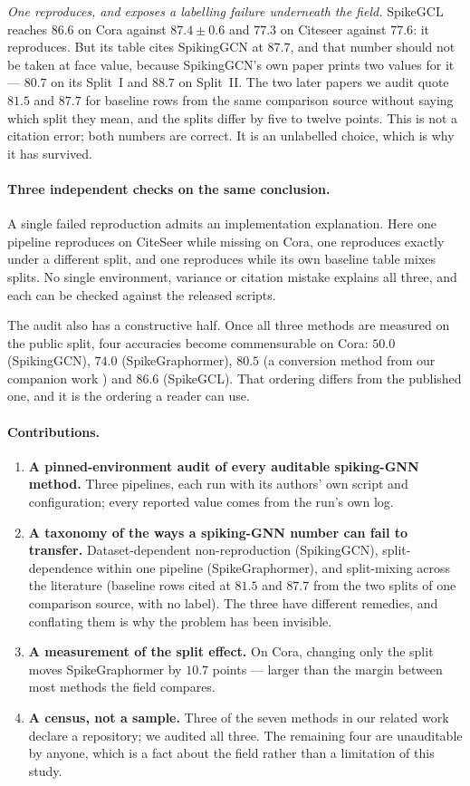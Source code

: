 \emph{One reproduces, and exposes a labelling failure underneath the field.} SpikeGCL reaches $86.6$
on Cora against $87.4 \pm 0.6$ and $77.3$ on Citeseer against $77.6$: it reproduces. But its table
cites SpikingGCN at $87.7$, and that number should not be taken at face value, because SpikingGCN's
own paper prints two values for it --- $80.7$ on its Split~I and $88.7$ on Split~II. The two later
papers we audit quote $81.5$ and $87.7$ for baseline rows from the same comparison source without saying which split they mean,
and the splits differ by five to twelve points. This is not a citation error; both numbers are
correct. It is an unlabelled choice, which is why it has survived.

\paragraph{Three independent checks on the same conclusion.} A single failed reproduction admits an
implementation explanation. Here one pipeline reproduces on CiteSeer while missing on Cora, one
reproduces exactly under a different split, and one reproduces while its own baseline table mixes
splits. No single environment, variance or citation mistake explains all three, and each can be
checked against the released scripts.

The audit also has a constructive half. Once all three methods are measured on the public split,
four accuracies become commensurable on Cora: $50.0$ (SpikingGCN), $74.0$ (SpikeGraphormer), $80.5$
(a conversion method from our companion work \citep{companion}) and $86.6$ (SpikeGCL). That ordering
differs from the published one, and it is the ordering a reader can use.

\paragraph{Contributions.}
\begin{enumerate}\itemsep2pt
\item \textbf{A pinned-environment audit of every auditable spiking-GNN method.} Three pipelines, each
run with its authors' own script and configuration; every reported value comes from the run's own
log.
\item \textbf{A taxonomy of the ways a spiking-GNN number can fail to transfer.} Dataset-dependent
non-reproduction (SpikingGCN), split-dependence within one pipeline (SpikeGraphormer), and
split-mixing across the literature (baseline rows cited at $81.5$ and $87.7$ from the two splits of
one comparison source, with no label). The
three have different remedies, and conflating them is why the problem has been invisible.
\item \textbf{A measurement of the split effect.} On Cora, changing only the split moves
SpikeGraphormer by $10.7$ points --- larger than the margin between most methods the field compares.
\item \textbf{A census, not a sample.} Three of the seven methods in our related work declare a
repository; we audited all three. The remaining four are unauditable by anyone, which is a fact about
the field rather than a limitation of this study.
\end{enumerate}

